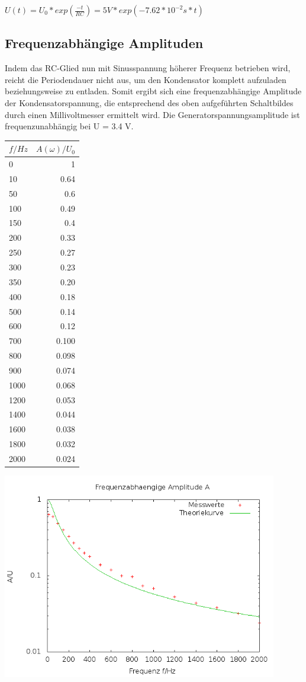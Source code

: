 $U(t) = U_0 * exp(\frac{-t}{RC}) = 5V*exp(-7.62*10^{-2}s*t)$

\subsection{Frequenzabhängige Amplituden}
Indem das RC-Glied nun mit Sinusspannung höherer Frequenz betrieben wird, reicht die Periodendauer nicht aus, um 
den Kondensator komplett aufzuladen beziehungsweise zu entladen. Somit ergibt sich eine frequenzabhängige Amplitude der 
Kondensatorspannung, die entsprechend des oben aufgeführten Schaltbildes durch einen Millivoltmesser ermittelt wird. 
Die Generatorspannungsamplitude ist frequenzunabhängig bei U = 3.4 V. 

\begin{minipage}[hbt]{5cm}
	\begin{tabular}{l|r}
$f/Hz$ & $A(\omega)/U_0$\\
\hline
0 &	1\\
10 &	0.64\\
50 &	0.6\\
100 &	0.49\\
150 &	0.4\\
200 &	0.33\\
250 &	0.27\\
300 &	0.23\\
350 &	0.20\\
400 &	0.18\\
500 &	0.14\\
600 &	0.12\\
700 &	0.100\\
800 &	0.098\\
900 &	0.074\\
1000 &	0.068\\
1200 &	0.053\\
1400 &	0.044\\
1600 &	0.038\\
1800 &	0.032\\
2000 &	0.024
\end{tabular}
\end{minipage}
\hfill
\begin{minipage}[hbt]{12cm}
	\centering
	\includegraphics[width=12cm]{_pics/RC2.png}
	\label{Bild2}
\end{minipage}\\

